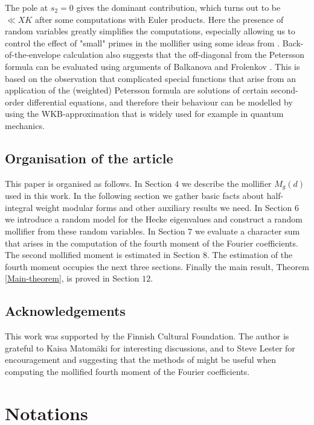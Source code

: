 \documentclass[a4paper,10pt,twoside]{amsart}
\theoremstyle{definition}
\numberwithin{equation}{section}
\renewcommand\:{\colon}
\begin{document}
The pole at $s_2=0$ gives the dominant contribution, which turns out to be $\ll XK$ after some computations with Euler products. Here the presence of random variables greatly simplifies the computations, especially allowing us to control the effect of "small" primes in the mollifier using some ideas from \cite{Bui-Evans-Lester-Pratt2022}. Back-of-the-envelope calculation also suggests that the off-diagonal from the Petersson formula can be evaluated using arguments of Balkanova and Frolenkov \cite{Balkanova-Frolenkov2021}. This is based on the observation that complicated special functions that arise from an application of the (weighted) Petersson formula are solutions of certain second-order differential equations, and therefore their behaviour can be modelled by using the WKB-approximation that is widely used for example in quantum mechanics.

\subsection{Organisation of the article}

This paper is organised as follows. In Section $4$ we describe the mollifier $M_g(d)$ used in this work. In the following section we gather basic facts about half-integral weight modular forms and other auxiliary results we need. In Section $6$ we introduce a random model for the Hecke eigenvalues and construct a random mollifier from these random variables. In Section $7$ we evaluate a character sum that arises in the computation of the fourth moment of the Fourier coefficients. The second mollified moment is estimated in Section $8$. The estimation of the fourth moment occupies the next three sections. Finally the main result, Theorem \ref{Main-theorem}, is proved in Section $12$.

\subsection{Acknowledgements}

\noindent This work was supported by the Finnish Cultural Foundation. The author is grateful to Kaisa Matom\"aki for interesting discussions, and to Steve Lester for encouragement and suggesting that the methods of \cite{Bui-Evans-Lester-Pratt2022} might be useful when computing the mollified fourth moment of the Fourier coefficients. 

\section{Notations}
\end{document}
